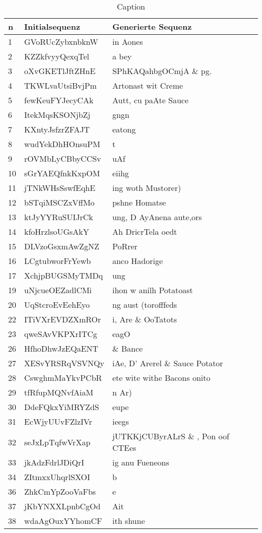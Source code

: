 \begin{center}
\begin{table}
\centering
\begin{tabular}{ |l|l|l| }

\hline
\textbf{n} & \textbf{Initialsequenz} & \textbf{Generierte Sequenz} \\
\hline
1 & GVoRUcZybxnbknW & in Aones \\
2 & KZZkfvyyQexqTel & a bey \\
3 & oXvGKETlJftZHnE & SPhKAQahbgOCmjA \& pg. \\
4 & TKWLvaUtsiBvjPm & Artonast wit Creme \\
5 & fewKeuFYJecyCAk & Autt, cu paAte Sauce \\
6 & ItekMqsKSONjbZj & gngn \\
7 & KXntyJsfzrZFAJT & eatong \\
8 & wudYekDhHOnsuPM & t \\
9 & rOVMbLyCBbyCCSv & uAf \\
10 & sGrYAEQfnkKxpOM & eiihg \\
11 & jTNkWHsSswfEqhE & ing woth Mustorer) \\
12 & bSTqiMSCZxVffMo & pshne Homatse \\
13 & ktJyYYRuSUIJrCk & ung, D AyAnena aute,ors \\
14 & kfoHrzlsoUGsAkY & Ah DricrTela oedt \\
15 & DLVzoGsxmAwZgNZ & PoRrer \\
16 & LCgtubworFrYewb & anco Hadorige \\
17 & XchjpBUGSMyTMDq & ung \\
19 & uNjcueOEZadlCMi & ihon w anilh Potatoast \\
20 & UqStcroEvEehEyo & ng aust (torofffeds \\
22 & ITiVXrEVDZXmROr & i, Are \& OoTatots \\
23 & qweSAvVKPXrITCg & eagO \\
26 & HfhoDhwJzEQaENT & \& Bance \\
27 & XESvYRSRqVSVNQy & iAe, D' Arerel \& Sauce Potator \\
28 & CswghmMaYkvPCbR & ete wite withe Bacons onito \\
29 & tfRfupMQNvfAiaM & n Ar) \\
30 & DdeFQkxYiMRYZdS & eupe \\
31 & EcWjyUUvFZlzIVr & ieegs \\
32 & seJxLpTqfwVrXap & jUTKKjCUByrALrS \& , Pon oof CTEes \\
33 & jkAdzFdrlJDiQrI & ig anu Fueneons \\
34 & ZItmxxUhqrlSXOI & b \\
36 & ZhkCmYpZooVaFbs & e \\
37 & jKbYNXXLpnbCgOd & Ait \\
38 & wdaAgOuxYYhomCF & ith shune \\
\hline
\end{tabular}
\caption{Caption}
\label{tab:first-sequences}
\end{table}
\end{center}
